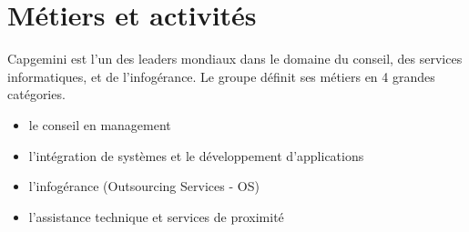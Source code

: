 \section{Métiers et activités}
Capgemini est l'un des leaders mondiaux dans le domaine du conseil, des services informatiques, et de l'infogérance.
Le groupe définit ses métiers en 4 grandes catégories.
\\
\begin{itemize}
\item le conseil en management
\item l'intégration de systèmes et le développement d'applications
\item l’infogérance (Outsourcing Services - OS)
\item l'assistance technique et services de proximité
\end{itemize}
